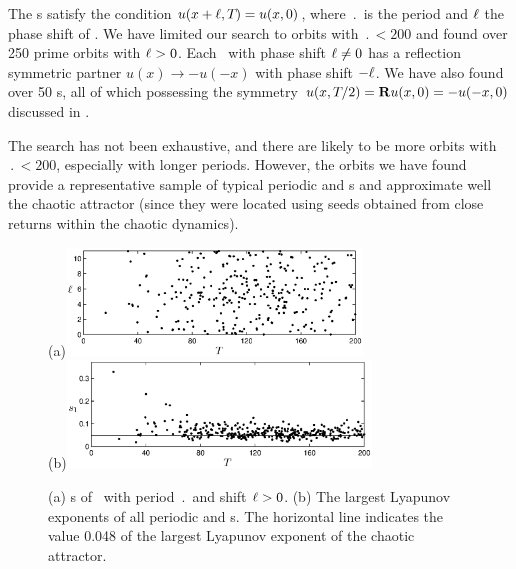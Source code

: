 

The \rpo s satisfy the condition $u(x+\ell,{T_{}}) = u(x,0)$,
where $\period{}$ is the period and $\ell$ the phase shift of \rpo .
We have limited our search to orbits with $\period{} < 200$ and found
over 250 prime orbits with $\ell > 0$.  Each \rpo\ with phase shift
$\ell \neq 0$ has a reflection symmetric partner
$u(x) \to -u(-x)$ with phase shift $-\ell$.  We have also found over
50 \po s, all of which possessing the symmetry $u(x,{T_{}}/2) =
{\bf R} u(x,0) = -u(-x,0)$ discussed in .

The search has not been exhaustive, and there are likely to be more
orbits with $\period{} < 200$, especially with longer periods.
However, the orbits we have found provide a representative sample of
typical periodic and \rpo s and approximate well the chaotic
attractor (since they were located using seeds obtained from close
returns within the chaotic dynamics).

\begin{figure}[t]
\begin{center}
(a)\hspace{1ex}\includegraphics[width=0.7\textwidth]{figs/ks22_rpos_Tdelta.eps}\\
(b)\includegraphics[width=0.72\textwidth]{figs/ks22_rpos_lyap.eps}
\end{center}
\caption{
(a) \Rpo s of \KSe\ with period $\period{}$ and shift $\ell > 0$.
(b) The largest Lyapunov exponents  of all periodic
and \rpo s.  The horizontal line indicates the value 0.048 of the largest 
Lyapunov exponent of the chaotic attractor.
} \label{f:ks22rposT}
\end{figure}

